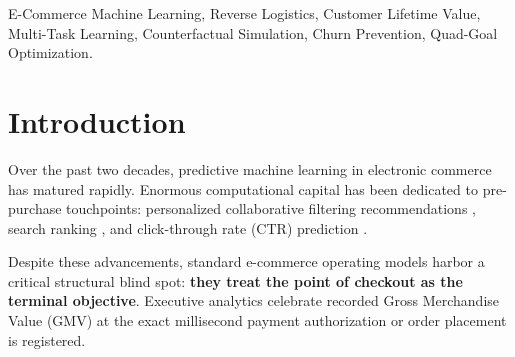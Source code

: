 \documentclass[conference]{IEEEtran}
\begin{document}
\begin{abstract}
Empirically validated on a multi-touch dataset of 25,000 interactions and 14,227 finalized transactions, ShopSense achieves a \textbf{+\$76,250.00 net realized margin lift (+7.49\%)}, a \textbf{4.70 percentage point reduction in product returns} (dropping from 21.07\% to 16.37\%), \textbf{\$12,115.79 in direct reverse logistics savings}, a \textbf{+0.20 star CSAT improvement}, and a \textbf{+9.09 percentage point lift in 90-day retention}. We also present the production deployment via a sub-50ms FastAPI REST microservice and an executive decision dashboard.
\end{abstract}

\begin{IEEEkeywords}
E-Commerce Machine Learning, Reverse Logistics, Customer Lifetime Value, Multi-Task Learning, Counterfactual Simulation, Churn Prevention, Quad-Goal Optimization.
\end{IEEEkeywords}

\section{Introduction}

Over the past two decades, predictive machine learning in electronic commerce has matured rapidly. Enormous computational capital has been dedicated to pre-purchase touchpoints: personalized collaborative filtering recommendations \cite{rendle2009bpr}, search ranking \cite{steck2010training}, and click-through rate (CTR) prediction \cite{guo2017deepfm}. 

Despite these advancements, standard e-commerce operating models harbor a critical structural blind spot: \textbf{they treat the point of checkout as the terminal objective}. Executive analytics celebrate recorded Gross Merchandise Value (GMV) at the exact millisecond payment authorization or order placement is registered. 
\end{document}
